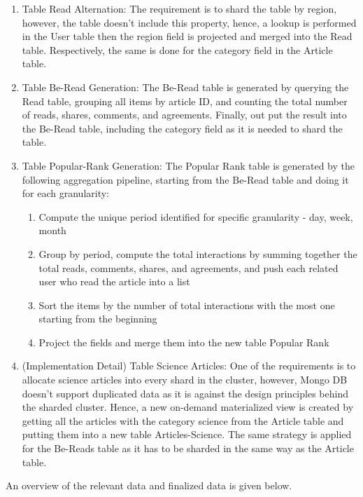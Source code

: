 \documentclass{article}
\begin{document}
    \begin{enumerate}
        \item Table Read Alternation: The requirement is to shard the table by region, however, the table doesn't include this property, hence, a lookup is performed in the User table then the region field is projected and merged into the Read table. Respectively, the same is done for the category field in the Article table.  
        \item Table Be-Read Generation: The Be-Read table is generated by querying the Read table, grouping all items by article ID, and counting the total number of reads, shares, comments, and agreements. Finally, out put the result into the Be-Read table, including the category field as it is needed to shard the table. 
        \item Table Popular-Rank Generation: The Popular Rank table is generated by the following aggregation pipeline, starting from the Be-Read table and doing it for each granularity:
         \begin{enumerate}
            \item Compute the unique period identified for specific granularity - day, week, month
            \item Group by period, compute the total interactions by summing together the total reads, comments, shares, and agreements, and push each related user who read the article into a list
            \item Sort the items by the number of total interactions with the most one starting from the beginning
            \item Project the fields and merge them into the new table Popular Rank
        \end{enumerate}
        \item (Implementation Detail) Table Science Articles: One of the requirements is to allocate science articles into every shard in the cluster, however, Mongo DB doesn't support duplicated data as it is against the design principles behind the sharded cluster. Hence, a new on-demand materialized view is created by getting all the articles with the category science from the Article table and putting them into a new table Articles-Science. The same strategy is applied for the Be-Reads table as it has to be sharded in the same way as the Article table.
    \end{enumerate}
    An overview of the relevant data and finalized data is given below. 
\end{document}

